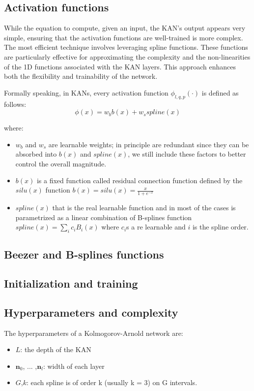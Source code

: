 \documentclass[12pt,a4paper]{article}
\begin{document}
\subsection{Activation functions}
While the equation to compute, given an input, the KAN's output appears very simple, ensuring that the activation functions are well-trained is more complex. The most efficient technique involves leveraging spline functions. These functions are particularly effective for approximating the complexity and the non-linearities of the 1D functions associated with the KAN layers. This approach enhances both the flexibility and trainability of the network.

Formally speaking, in KANs, every activation function $\phi_{l,q,p}(\cdot)$ is defined as follows:
$$\phi(x) = w_bb(x) + w_sspline(x) $$

where:
\begin{itemize}
    \item $w_b$ and $w_s$ are learnable weights; in principle are redundant since they can be absorbed into $b(x)$ and $spline(x)$, we still include these factors to better control the overall magnitude.
    \item $b(x)$ is a fixed function called residual connection function defined by the $silu(x)$ function $b(x) = silu(x) = \frac{x}{1+e^{-x}}$
    \item $spline(x)$ that is the real learnable function and in most of the cases is parametrized as a linear combination of B-splines function $spline(x)= \sum_i c_iB_i(x)$ where $c_i$s a re learnable and $i$ is the spline order.
\end{itemize}

\subsection{Beezer and B-splines functions}

\subsection{Initialization and training}

\subsection{Hyperparameters and complexity}
The hyperparameters of a Kolmogorov-Arnold network are:
\begin{itemize}
    \item \textbf{$L$}: the depth of the KAN
    \item $\textbf{n}_0$, ... ,$\textbf{n}_l$: width of each layer
    \item \textbf{$G$},\textbf{$k$}: each spline is of order k (usually k = 3) on G intervals.
\end{itemize}
\end{document}
